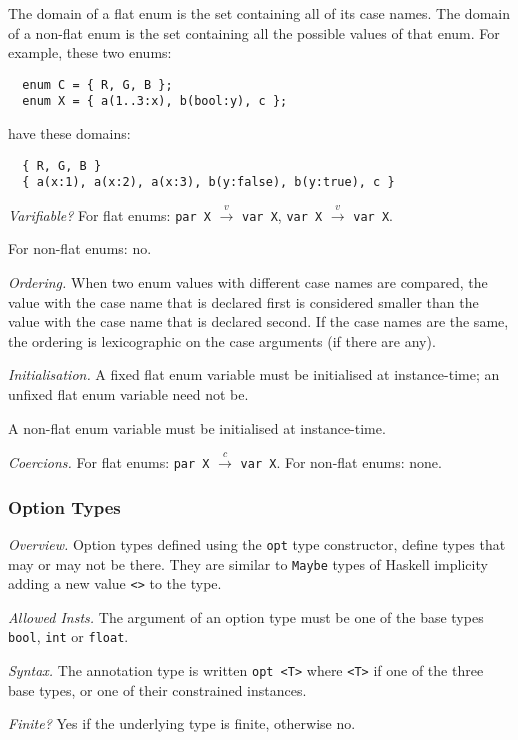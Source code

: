 \documentclass[10pt]{scrartcl}
\newcommand{\TyThing}[1]{\vspace{1.2mm}\noindent\emph{#1} }
\newcommand{\TyOverview}{\TyThing{Overview.}}
\newcommand{\TyInsts}{\TyThing{Allowed Insts.}}
\newcommand{\TySyntax}{\TyThing{Syntax.}}
\newcommand{\TyFiniteType}{\TyThing{Finite?}}
\newcommand{\TyVarifiable}{\TyThing{Varifiable?}}
\newcommand{\TyOrdering}{\TyThing{Ordering.}}
\newcommand{\TyInit}{\TyThing{Initialisation.}}
\newcommand{\TyCoercions}{\TyThing{Coercions.}}
\newcommand{\coerce}[2]{#1 $\stackrel{c}{\rightarrow}$ #2}
\newcommand{\varify}[2]{#1 $\stackrel{v}{\rightarrow}$ #2}
\begin{document}
{The domain of a flat enum is the set containing all of its case names.  The
domain of a non-flat enum is the set containing all the possible values of that
enum.  For example, these two enums:
\begin{verbatim}
  enum C = { R, G, B };
  enum X = { a(1..3:x), b(bool:y), c };
\end{verbatim}
have these domains:
\begin{verbatim}
  { R, G, B }
  { a(x:1), a(x:2), a(x:3), b(y:false), b(y:true), c }
\end{verbatim}

\TyVarifiable
For flat enums:
\varify{\texttt{par X}}{\texttt{var X}},
\varify{\texttt{var X}}{\texttt{var X}}.

For non-flat enums: no.

\TyOrdering
When two enum values with different case names are compared, the value with
the case name that is declared first is considered smaller than the value
with the case name that is declared second.  If the case names are the same,
the ordering is lexicographic on the case arguments (if there are any).

\TyInit
A fixed flat enum variable must be initialised at instance-time;  an unfixed
flat enum variable need not be.

A non-flat enum variable must be initialised at instance-time.

\TyCoercions
For flat enums:
\coerce{\texttt{par X}}{\texttt{var X}}.  For non-flat enums: none.
}

\subsubsection{Option Types}
        \label{option types}
\TyOverview
Option types defined using the \texttt{opt} type constructor, define types
that may or may not be there. They are similar to \texttt{Maybe} types of
Haskell implicity adding a new value \texttt{<>} to the type.


\TyInsts
The argument of an option type must be one of the base types
\texttt{bool}, \texttt{int} or \texttt{float}.

\TySyntax
The annotation type is written \texttt{opt <T>} where \texttt{<T>} if one of
the three base types, or one of their constrained instances.

\TyFiniteType
Yes if the underlying type is finite, otherwise no.
\end{document}
